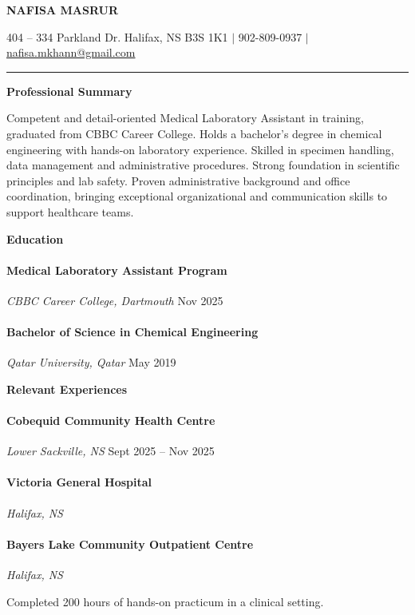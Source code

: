 \documentclass[11pt]{article} %
\newcommand{\cvsection}[1] {
  \begin{center}
    \large\textbf{#1}
  \end{center}
}
\begin{document}
\begin{center}
  \textbf{\huge NAFISA MASRUR}

  404 -- 334 Parkland Dr. Halifax, NS B3S 1K1 $|$ 902-809-0937 $|$ \href{mailto:nafisa.mkhann@gmail.com}{nafisa.mkhann@gmail.com}\hrule
\end{center}

\cvsection{Professional Summary}
Competent and detail-oriented Medical Laboratory Assistant in training, graduated from CBBC Career College. Holds a bachelor's degree in chemical engineering with hands-on laboratory experience. Skilled in specimen handling, data management and administrative procedures. Strong foundation in scientific principles and lab safety. Proven administrative background and office coordination, bringing exceptional organizational and communication skills to support healthcare teams.

\cvsection{Education}

\paragraph{Medical Laboratory Assistant Program} \emph{CBBC Career College, Dartmouth} \hfill Nov 2025

\paragraph{Bachelor of Science in Chemical Engineering} \emph{Qatar University, Qatar} \hfill May 2019

\cvsection{Relevant Experiences}

\paragraph{Cobequid Community Health Centre} \emph{Lower Sackville, NS} \hfill Sept 2025 -- Nov 2025

\paragraph{Victoria General Hospital} \emph{Halifax, NS}

\paragraph{Bayers Lake Community Outpatient Centre} \emph{Halifax, NS}

Completed 200 hours of hands-on practicum in a clinical setting.
\end{document}
